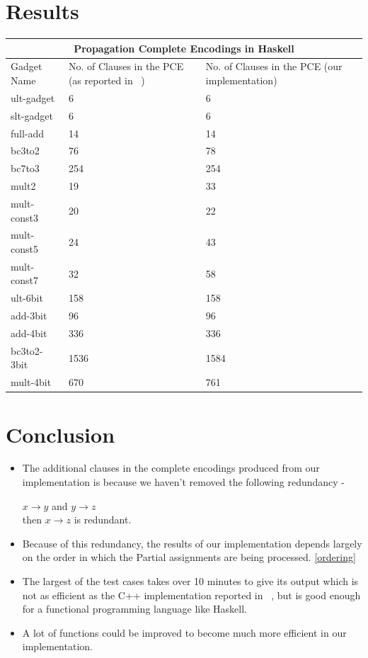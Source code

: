 \documentclass{article}
\theoremstyle{plain}
\begin{document}
\section{Results}
\begin{tabular}{ |p{4cm}||p{5cm}|p{5cm}|  }
 \hline
 \multicolumn{3}{|c|}{Propagation Complete Encodings in Haskell} \\
 \hline
 Gadget Name& No. of Clauses in the PCE (as reported in ~\cite{PCE}) & No. of Clauses in the PCE (our implementation) \\
 \hline
ult-gadget& 6 & 6 \\
slt-gadget& 6 & 6 \\
full-add& 14 & 14 \\
bc3to2& 76 & 78 \\
bc7to3& 254 & 254 \\
mult2& 19 & 33 \\
mult-const3 & 20 & 22 \\
mult-const5 & 24 & 43 \\
mult-const7 & 32 & 58 \\
ult-6bit & 158 & 158 \\
add-3bit & 96 & 96 \\
add-4bit & 336 & 336 \\
bc3to2-3bit & 1536 & 1584 \\
mult-4bit & 670 & 761 \\
 \hline
\end{tabular}

\section{Conclusion}
\begin{itemize}
\item The additional clauses in the complete encodings produced from our implementation is because we haven't removed the following redundancy -
\begin{center}
$x \longrightarrow y$ and $y \longrightarrow z$ \\
then $x \longrightarrow z$ is redundant. 
\end{center}
\item Because of this redundancy, the results of our implementation depends largely on the order in which the Partial assignments are being processed. \ref{ordering}
\item The largest of the test cases takes over 10 minutes to give its output which is not as efficient as the C++ implementation reported in ~\cite{PCE}, but is good enough for a functional programming language like Haskell. 
\item A lot of functions could be improved to become much more efficient in our implementation.
\end{itemize}
\nocite{*}


\end{document}
